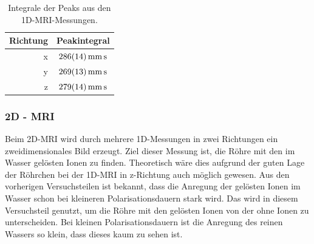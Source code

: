 \documentclass[../../main.tex]{subfiles}
\begin{document}
        \begin{table}[h!]
            \centering
            \begin{tabular}{r|c}
            Richtung & Peakintegral                            \\ \hline
            x        & $\SI{286 +- 14}{\milli \metre \second}$ \\
            y        & $\SI{269 +- 13}{\milli \metre \second}$ \\
            z        & $\SI{279 +- 14}{\milli \metre \second}$
            \end{tabular}
            \caption{Integrale der Peaks aus den 1D-MRI-Messungen.}
            \label{tab:MRI_1D_Integrale}
        \end{table}
        
    \subsubsection{2D - MRI}
        Beim 2D-MRI wird durch mehrere 1D-Messungen in zwei Richtungen ein zweidimensionales Bild erzeugt. Ziel dieser Messung ist, die Röhre mit den im Wasser gelösten Ionen zu finden. Theoretisch wäre dies aufgrund der guten Lage der Röhrchen bei der 1D-MRI in z-Richtung auch möglich gewesen. Aus den vorherigen Versuchsteilen ist bekannt, dass die Anregung der gelösten Ionen im Wasser schon bei kleineren Polarisationsdauern stark wird. Das wird in diesem Versuchsteil genutzt, um die Röhre mit den gelösten Ionen von der ohne Ionen zu unterscheiden. Bei kleinen Polarisationsdauern ist die Anregung des reinen Wassers so klein, dass dieses kaum zu sehen ist. 
\end{document}
